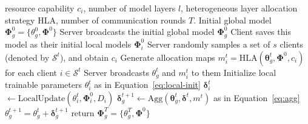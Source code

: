 \documentclass[lettersize,journal]{IEEEtran}
\begin{document}
\setlength{\textfloatsep}{3pt}%
\begin{algorithm}[t]
\caption{Fed-HeLLo}\label{algorithm-ours}
\begin{algorithmic}[1]
\REQUIRE 
resource capability $c_i$, number of model layers $l$, heterogeneous layer allocation strategy HLA, number of communication rounds $T$.
\STATE Initial global model $\boldsymbol{\Phi}_g^0=\{\boldsymbol{\mathcal{\theta}}_g^0, \boldsymbol{\Phi}^0 \}$
    \STATE Server broadcasts the initial global model $\boldsymbol{\Phi}_g^0$
    \STATE Client saves this model as their initial local models $\boldsymbol{\Phi}_i^0$
\ENDFOR
{}
    \STATE Server randomly samples a set of $s$ clients (denoted by $\mathcal{S}^t$), and obtain $c_i$
    \STATE Generate allocation maps $m_i^t= \text{HLA}(\boldsymbol{\theta}_{g}^t,\boldsymbol{\Phi}^0,c_i)$ for each client $i\in\mathcal{S}^t$ %
    \STATE Server broadcasts $\boldsymbol{\mathcal{\theta}}_g^t$ and $m_i^t$ to them
        \STATE Initialize local trainable parameters $\boldsymbol{\mathcal{\theta}}_i^{t}$ as in Equation~\eqref{eq:local-init}
        \STATE $\boldsymbol{\delta}_i^{t}$ $\leftarrow \text{LocalUpdate}(\boldsymbol{\mathcal{\theta}}_i^{t}, \boldsymbol{\Phi}^0_i, D_i)$
    \ENDFOR
    \STATE $\boldsymbol{\delta}^{t+1}_g \leftarrow \text{Agg}(\boldsymbol{\theta}_{g}^t, \boldsymbol{\delta}^{t}, m^t)$ as in Equation~\eqref{eq:agg}
    \STATE $\boldsymbol{\mathcal{\theta}}_g^{t+1} = \boldsymbol{\mathcal{\theta}}_g^t + \boldsymbol{\delta}^{t+1}_g$
\ENDFOR
\STATE return $\boldsymbol{\Phi}_g^T=\{\boldsymbol{\mathcal{\theta}}_g^T, \boldsymbol{\Phi}^0 \}$
\end{algorithmic}
\end{algorithm}
\end{document}
